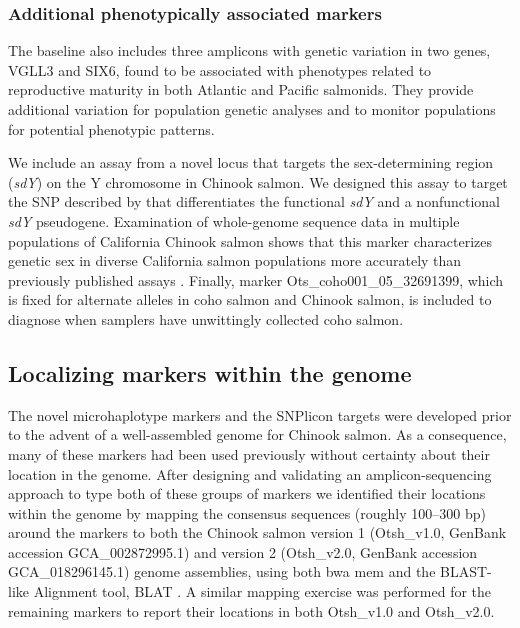 \subsubsection*{Additional phenotypically associated markers}

The baseline also includes three amplicons with genetic variation
in two genes, VGLL3 and SIX6,
found to be associated with phenotypes related to reproductive maturity in both
Atlantic \citep{barson2015sex} and Pacific \citep{waters2021heterogeneous} salmonids. They
provide additional variation for population genetic analyses and to
monitor populations for potential phenotypic patterns.

We include an assay from a novel locus that targets the sex-determining region ({\em sdY}) on the Y chromosome in Chinook salmon. We designed this assay to target the SNP described by \citet{bertho2022nonfunctional} that differentiates the functional {\em sdY} and a nonfunctional {\em sdY} pseudogene.  Examination of whole-genome sequence data in multiple populations of California Chinook salmon \citep{thompson2020complex} shows that this
marker characterizes genetic sex in diverse California salmon populations more accurately than previously published assays  \citep{von2015development}.
Finally, marker Ots\_coho001\_05\_32691399, which is fixed for alternate alleles in
coho salmon and Chinook salmon, is included to diagnose when samplers have unwittingly
collected coho salmon.

\subsection*{Localizing markers within the genome}

The novel microhaplotype markers and the SNPlicon targets were
developed prior to the advent of a well-assembled genome for Chinook salmon.
As a consequence, many of these markers had
been used previously without certainty about their location in the genome.
After designing and validating an amplicon-sequencing approach to type both of these
groups of markers we identified their locations within the genome by mapping the
consensus sequences (roughly 100--300 bp) around the markers
to both the Chinook salmon version 1 (Otsh\_v1.0, GenBank accession GCA\_002872995.1)
and version 2  (Otsh\_v2.0, GenBank accession GCA\_018296145.1) genome assemblies,
using both bwa mem \citep{bwa-mem2009} and the BLAST-like Alignment tool, BLAT \citep{kent2002blat}.
A similar mapping exercise was performed for the remaining markers to
report their locations in both Otsh\_v1.0 and Otsh\_v2.0.


